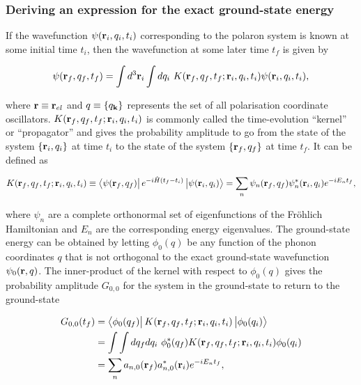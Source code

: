 \subsubsection{Deriving an expression for the exact ground-state energy}

If the wavefunction $\psi(\vb{r}_{i}, q_i, t_i)$ corresponding to the polaron system is known at some initial time $t_{i}$, then the wavefunction at some later time $t_f$ is given by

\begin{equation}
    \psi(\vb{r}_{f}, q_{f}, t_f) = \int d^3\vb{r}_{i} \int dq_i\ K(\vb{r}_{f}, q_f, t_f; \vb{r}_{i}, q_i, t_i) \psi(\vb{r}_{i}, q_i, t_i),
\end{equation}

where $\vb{r} \equiv \vb{r}_{el}$ and $q \equiv \{q_{\vb{k}}\}$ represents the set of all polarisation coordinate oscillators. $K(\vb{r}_{f}, q_f, t_f; \vb{r}_{i}, q_i, t_i)$ is commonly called the time-evolution ``kernel'' or ``propagator'' and gives the probability amplitude to go from the state of the system $\{\vb{r}_{i}, q_i\}$ at time $t_i$ to the state of the system $\{\vb{r}_{f}, q_f\}$ at time $t_f$. It can be defined as

\begin{equation}
    K(\vb{r}_{f}, q_f, t_f; \vb{r}_{i}, q_i, t_i) \equiv \bra{\psi(\vb{r}_f, q_f)} e^{-i\hat{H}(t_f - t_i)} \ket{\psi(\vb{r}_i, q_i)} = \sum_n \psi_n(\vb{r}_f, q_f) \psi_n^*(\vb{r}_i, q_i) e^{-i E_n t_f},
\end{equation}

where $\psi_n$ are a complete orthonormal set of eigenfunctions of the Fr\"ohlich Hamiltonian and $E_n$ are the corresponding energy eigenvalues. The ground-state energy can be obtained by letting $\phi_0(q)$ be any function of the phonon coordinates $q$ that is not orthogonal to the exact ground-state wavefunction $\psi_0(\vb{r}, q)$. The inner-product of the kernel with respect to $\phi_0(q)$ gives the probability amplitude $G_{0,0}$ for the system in the ground-state to return to the ground-state 

\begin{equation}
\begin{aligned}
    G_{0,0}(t_f) &= \bra{\phi_0(q_f)} K(\vb{r}_{f}, q_f, t_f; \vb{r}_{i}, q_i, t_i) \ket{\phi_0(q_i)} \\
    &= \int\int dq_f dq_i\ \phi_0^*(q_f) K(\vb{r}_{f}, q_f, t_f; \vb{r}_{i}, q_i, t_i) \phi_0(q_i) \\
    &= \sum_n a_{n,0}(\vb{r}_f) a^*_{n,0}(\vb{r}_i) e^{-i E_n t_f},
\end{aligned}
\end{equation}

